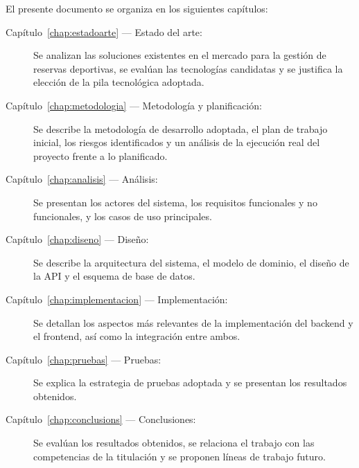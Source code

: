 El presente documento se organiza en los siguientes capítulos:

\begin{description}
  \item[Capítulo~\ref{chap:estadoarte} — Estado del arte:] Se analizan las
    soluciones existentes en el mercado para la gestión de reservas deportivas,
    se evalúan las tecnologías candidatas y se justifica la elección de la pila
    tecnológica adoptada.

  \item[Capítulo~\ref{chap:metodologia} — Metodología y planificación:] Se
    describe la metodología de desarrollo adoptada, el plan de trabajo inicial,
    los riesgos identificados y un análisis de la ejecución real del proyecto
    frente a lo planificado.

  \item[Capítulo~\ref{chap:analisis} — Análisis:] Se presentan los actores del
    sistema, los requisitos funcionales y no funcionales, y los casos de uso
    principales.

  \item[Capítulo~\ref{chap:diseno} — Diseño:] Se describe la arquitectura del
    sistema, el modelo de dominio, el diseño de la API y el esquema de base
    de datos.

  \item[Capítulo~\ref{chap:implementacion} — Implementación:] Se detallan los
    aspectos más relevantes de la implementación del backend y el frontend,
    así como la integración entre ambos.

  \item[Capítulo~\ref{chap:pruebas} — Pruebas:] Se explica la estrategia de
    pruebas adoptada y se presentan los resultados obtenidos.

  \item[Capítulo~\ref{chap:conclusions} — Conclusiones:] Se evalúan los
    resultados obtenidos, se relaciona el trabajo con las competencias de la
    titulación y se proponen líneas de trabajo futuro.
\end{description}
